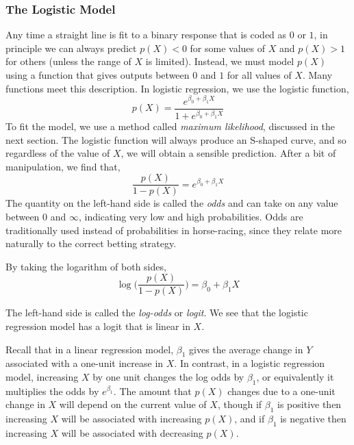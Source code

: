 \documentclass{article}
\numberwithin{equation}{section}
\begin{document}
\begin{enumerate}
\subsubsection{The Logistic Model}
Any time a straight line is fit to a binary response that is coded as $0$ or $1$, in principle we can always predict $p(X) < 0$ for some values of $X$ and $p(X) > 1$ for others (unless the range of $X$ is limited). Instead, we must model $p(X)$ using a function that gives outputs between $0$ and $1$ for all values of $X$. Many functions meet this description. In logistic regression, we use the logistic function,
\begin{equation}
    p(X) = \frac{e^{\beta_0 + \beta_1 X}}{1 + e^{\beta_0 + \beta_1 X}}
\end{equation}
To fit the model, we use a method called \textit{maximum likelihood}, discussed in the next section. The logistic function will always produce an S-shaped curve, and so regardless of the value of $X$, we will obtain a sensible prediction. After a bit of manipulation, we find that,
\begin{equation}
    \frac{p(X)}{1-p(X)} = e^{\beta_0+\beta_1 X}
\end{equation}
The quantity on the left-hand side is called the \textit{odds} and can take on any value between 0 and $\infty$, indicating very low and high probabilities. Odds are traditionally used instead of probabilities in horse-racing, since they relate more naturally to the correct betting strategy.

By taking the logarithm of both sides,
\begin{equation}
    \log \Bigg ( \frac{p(X)}{1-p(X)} \Bigg ) = \beta_0+\beta_1 X
\end{equation}

The left-hand side is called the \textit{log-odds} or \textit{logit}. We see that the logistic regression model has a logit that is linear in $X$.

Recall that in a linear regression model, $\beta_1$ gives the average change in $Y$ associated with a one-unit increase in $X$. In contrast, in a logistic regression model, increasing $X$ by one unit changes the log odds by $\beta_1$, or equivalently it multiplies the odds by $e^{\beta_1}$. The amount that $p(X)$ changes due to a one-unit change in $X$ will depend on the current value of $X$, though if $\beta_1$ is positive then increasing $X$ will be associated with increasing $p(X)$,
and if $\beta_1$ is negative then increasing $X$ will be associated with decreasing $p(X)$.


\end{enumerate}
\end{document}
